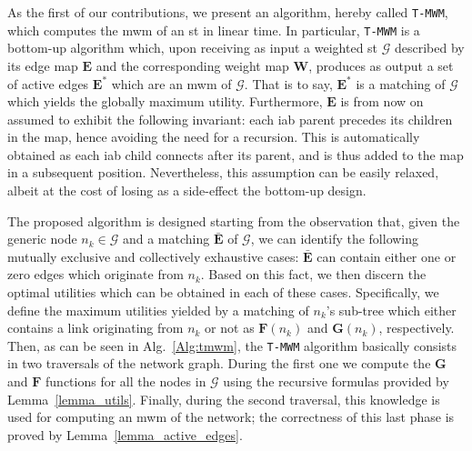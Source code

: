 As the first of our contributions, we present an algorithm, hereby called \texttt{T-MWM}, which computes the \gls{mwm} of an \gls{st} in linear time. In particular, \texttt{T-MWM} is a bottom-up algorithm which, upon receiving as input a weighted \gls{st} $\mathcal{G}$ described by its edge map $\mathbf{E}$ and the corresponding weight map $\mathbf{W}$, produces as output a set of active edges $\mathbf{E^*}$ which are an \gls{mwm} of $\mathcal{G}$. That is to say, $\mathbf{E^*}$ is a matching of $\mathcal{G}$ which yields the globally maximum utility.
Furthermore, $\mathbf{E}$ is from now on assumed to exhibit the following invariant: each \gls{iab} parent precedes its children in the map, hence avoiding the need for a recursion. 
This is automatically obtained as each \gls{iab} child connects after its parent, and is thus added to the map in a subsequent position.
Nevertheless, this assumption can be easily relaxed, albeit at the cost of losing as a side-effect the bottom-up design.


The proposed algorithm is designed starting from the observation that, given the generic node $n_k \in \mathcal{G}$ and a matching $\mathbf{\bar{E}}$ of $\mathcal{G}$, we can identify the following mutually exclusive and collectively exhaustive cases: $\mathbf{\bar{E}}$ can contain either one or zero edges which originate from $n_k$. Based on this fact, we then discern the optimal utilities which can be obtained in each of these cases. Specifically, we define the maximum utilities yielded by a matching of $n_k$'s sub-tree which either contains a link originating from $n_k$ or not as $\mathbf{F}(n_k)$ and $\mathbf{G}(n_k)$, respectively.
Then, as can be seen in Alg.~\ref{Alg:tmwm}, the \texttt{T-MWM} algorithm basically consists in two traversals of the network graph. During the first one we compute the $\mathbf{G}$ and $\mathbf{F}$ functions for all the nodes in $\mathcal{G}$ using the recursive formulas provided by Lemma~\ref{lemma_utils}. Finally, during the second traversal, this knowledge is used for computing an \gls{mwm} of the network; the correctness of this last phase is proved by Lemma~\ref{lemma_active_edges}.


